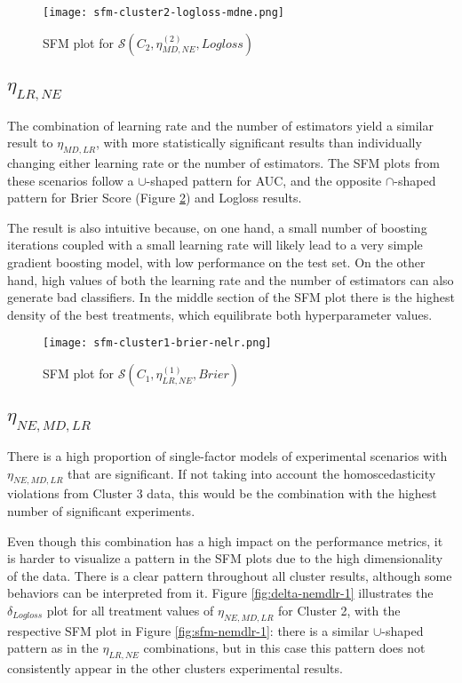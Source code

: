 \begin{figure}[H]
    \centering
    \texttt{[image: sfm-cluster2-logloss-mdne.png]}
    \caption{SFM plot for $\mathcal{S}(C_2, \eta^{(2)}_{MD, NE}, Logloss)$}
    \label{fig:sfm-mdne-1}
\end{figure}

\subsection{\texorpdfstring{\Large$\eta_{LR, NE}$}{}}

The combination of learning rate and the number of estimators yield a similar result to $\eta_{MD, LR}$, with more statistically significant results than individually changing either learning rate or the number of estimators. The SFM plots from these scenarios follow a $\cup$-shaped pattern for AUC, and the opposite $\cap$-shaped pattern for Brier Score (Figure \ref{fig:sfm-lrne-1}) and Logloss results.

The result is also intuitive because, on one hand, a small number of boosting iterations coupled with a small learning rate will likely lead to a very simple gradient boosting model, with low performance on the test set. On the other hand, high values of both the learning rate and the number of estimators can also generate bad classifiers. In the middle section of the SFM plot there is the highest density of the best treatments, which equilibrate both hyperparameter values.

\begin{figure}[H]
    \centering
    \texttt{[image: sfm-cluster1-brier-nelr.png]}
    \caption{SFM plot for $\mathcal{S}(C_1, \eta^{(1)}_{LR, NE}, Brier)$}
    \label{fig:sfm-lrne-1}
\end{figure}

\subsection{\texorpdfstring{\Large$\eta_{NE, MD, LR}$}{}}

There is a high proportion of single-factor models of experimental scenarios with $\eta_{NE, MD, LR}$ that are significant. If not taking into account the homoscedasticity violations from Cluster 3 data, this would be the combination with the highest number of significant experiments.

Even though this combination has a high impact on the performance metrics, it is harder to visualize a pattern in the SFM plots due to the high dimensionality of the data. There is a clear pattern throughout all cluster results, although some behaviors can be interpreted from it. Figure \ref{fig:delta-nemdlr-1} illustrates the $\delta_{Logloss}$ plot for all treatment values of $\eta_{NE, MD, LR}$ for Cluster 2, with the respective SFM plot in Figure \ref{fig:sfm-nemdlr-1}: there is a similar $\cup$-shaped pattern as in the $\eta_{LR, NE}$ combinations, but in this case this pattern does not consistently appear in the other clusters experimental results.

